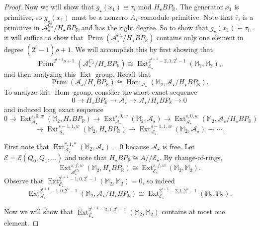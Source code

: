 \documentclass{amsart}
\theoremstyle{plain}
\numberwithin{equation}{section}
\numberwithin{figure}{section}
\DeclareMathOperator{\Ext}{Ext}
\DeclareMathOperator{\Hom}{Hom}
\DeclareMathOperator{\Prim}{Prim}
\newcommand{\mM}{{\mathbb M}}
\newcommand{\mR}{{\mathbb R}}
\newcommand{\cA}{{\mathcal A}}
\newcommand{\cE}{{\mathcal E}}
\newcommand{\0}{\langle 0 \rangle }
\begin{document}
\begin{proof}
Now we will show that $g_{\star}(x_{1}) \equiv \tau_{i}$ mod $H_{\star}BP_{\mR}$. The generator $x_{1}$ is primitive, so $g_{\star}(x_{1})$ must be a nonzero $A_{\star}$-comodule primitive. Note that $\bar{\tau}_{i}$ is a primitive in ${\cA}^{C_2}_\star / H_\star BP_\mR$ and has the right degree. So to show that $g_{\star}(x_{1}) \equiv \bar{\tau}_{i}$, it will suffice to show that ${\Prim}({\cA}^{C_2}_\star / H_\star BP_\mR)$ contains only one element in degree $(2^{i}-1)\rho + 1$. We will accomplish this by first showing that 
\[ 
{\Prim}^{2^{i+1}\rho + 1}({\cA}^{C_2}_\star / H_\star BP_\mR) \cong \Ext_{\cE_{\star}}^{2^{i+1}-2,1,2^{i}-1}(\mathbb{M}_{2},\mathbb{M}_{2}) ,
\]
and then analyzing this $\Ext$ group.
Recall that 
\[
{\Prim}({\cA}_\star / H_\star BP_\mR) \cong \Hom_{\cA_{\star}}\left(\mM_{2}, {\cA}_\star / H_\star BP_\mR\right) .\]
To analyze this $\Hom$ group, consider the short exact sequence \[ 0 \to H_{\star}BP_{\mR} \to \cA_{\star} \to \cA_{\star}/H_{\star}BP_{\mR} \to 0 \]
and induced long exact sequence 
\[ 0 \to \Ext_{\cA_{\star}}^{s,0,w}(\mathbb{M}_{2},H_{*}BP_{\mR}) \to  \Ext_{\cA_{\star}}^{s,0,w}(\mathbb{M}_{2}, \cA_{\star}) \to   \Ext_{\cA_{\star}}^{s,0,w}(\mathbb{M}_{2}, \cA_{\star}/H_{\star}BP_{\mR})\]
\[ \to \Ext_{\cA_{\star}}^{s-1,1,w}(\mathbb{M}_{2},H_{\star}BP_{\mR}) \to \Ext_{\cA_{\star}}^{s-1,1,w}(\mathbb{M}_{2}, \cA_{\star}) \to \cdots.\]

First note that 
$\Ext_{\cA_{\star}}^{*,1,*}(\mathbb{M}_{2}, \cA_{\star}) = 0$ because $\cA_{\star}$ is free. Let $\cE = \cE(Q_{0}, Q_{1}, \ldots)$ and note that $H_{\star}BP_{\mR} \cong A//\cE_{\star}$. By change-of-rings,
\[ \Ext^{s,f,w}_{{\cA}^{C_2}_\star} (\mM_{2}, H_\star BP_\mR ) \cong \Ext^{s,f,w}_{\cE_{\star}} (\mM_{2}, \mM_{2}).\] 
 Observe that $\Ext^{2^{i+1}-1,0,2^{i}-1}_{\cE_\star}(\mathbb{M}_{2}, \mathbb{M}_{2}) = 0$, so indeed
 \[ \Ext^{2^{i+1}-1,0,2^{i}-1}_{\cA_{\star}}(\mathbb{M}_{2}, \cA_{\star}/H_{\star}BP_{\mR}) \cong \Ext_{\cE_{\star}}^{2^{i+1}-2,1,2^{i}-1}(\mathbb{M}_{2},\mathbb{M}_{2}) .\]
 
 Now we will show that $\Ext_{\cE_{\star}}^{2^{i+1}-2,1,2^{i}-1}(\mathbb{M}_{2},\mathbb{M}_{2})$ contains at most one element.


\end{proof}
\end{document}
